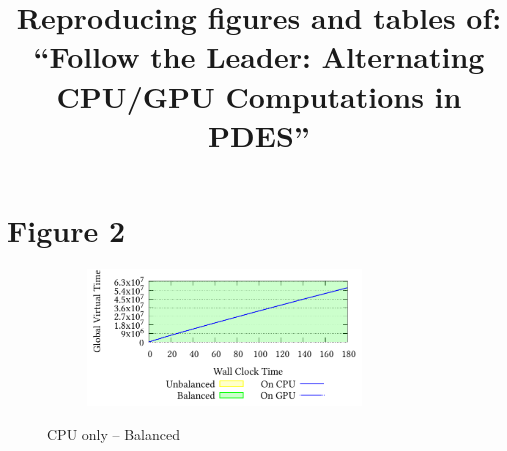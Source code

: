 \documentclass[]{article}
\title{Reproducing figures and tables of: ``Follow the Leader: Alternating CPU/GPU Computations in PDES''}
\author{}
\date{}
\begin{document}
\maketitle


\setcounter{figure}{2}

\section*{Figure 2}

\newcommand{\mysize}{0.75\linewidth}


\renewcommand{\mysize}{0.45\linewidth}

\setcounter{figure}{1}
\renewcommand{\thefigure}{\arabic{figure}a}
\begin{figure}[!h]
\centering
\begin{subfigure}[b]{\mysize}
\centering
\includegraphics[width=0.8\textwidth]{figures_original/balanced/1.processed.pdf}
\renewcommand{\thesubfigure}{Original}
\caption{}
\end{subfigure}
\begin{subfigure}[b]{\mysize}
\centering
{}
\renewcommand{\thesubfigure}{Reproduced}
\caption{}
\end{subfigure}
\caption{CPU only – Balanced}
\end{figure}
\end{document}
